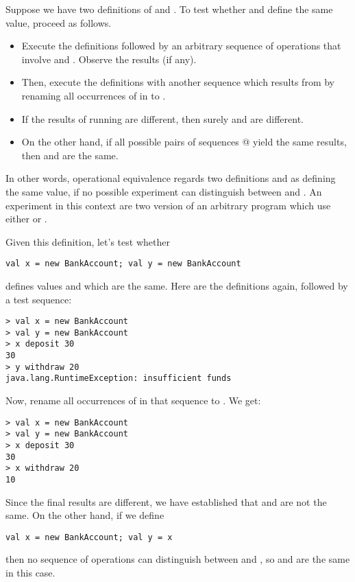 Suppose we have two definitions of  and .
To test whether  and  define the same value, proceed
as follows.
\begin{itemize}
\item
Execute the definitions followed by an
arbitrary sequence  of operations that involve  and
. Observe the results (if any).
\item
Then, execute the definitions with another sequence  which
results from  by renaming all occurrences of  in
 to .
\item
If the results of running  are different, then surely
 and  are different.
\item
On the other hand, if all possible pairs of sequences @
yield the same results, then  and  are the same.
\end{itemize}
In other words, operational equivalence regards two definitions
 and  as defining the same value, if no possible
experiment can distinguish between  and . An
experiment in this context are two version of an arbitrary program which use either
 or .
 
Given this definition, let's test whether
\begin{lstlisting}
val x = new BankAccount; val y = new BankAccount
\end{lstlisting}
defines values  and  which are the same.
Here are the definitions again, followed by a test sequence:

\begin{lstlisting}
> val x = new BankAccount
> val y = new BankAccount
> x deposit 30
30
> y withdraw 20
java.lang.RuntimeException: insufficient funds
\end{lstlisting}

Now, rename all occurrences of  in that sequence to
. We get:
\begin{lstlisting}
> val x = new BankAccount
> val y = new BankAccount
> x deposit 30
30
> x withdraw 20
10
\end{lstlisting}
Since the final results are different, we have established that
 and  are not the same.
On the other hand, if we define
\begin{lstlisting}
val x = new BankAccount; val y = x
\end{lstlisting}
then no sequence of operations can distinguish between  and
, so  and  are the same in this case.

